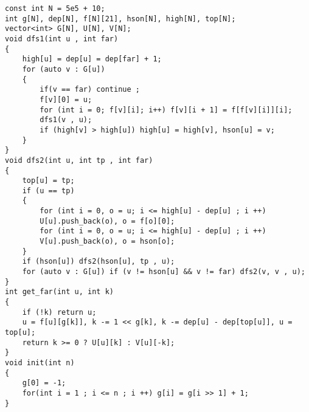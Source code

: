 \documentclass[E:/GsjzTle/main/main.tex]{subfiles}
\begin{document}
\begin{lstlisting}
const int N = 5e5 + 10;
int g[N], dep[N], f[N][21], hson[N], high[N], top[N];
vector<int> G[N], U[N], V[N];
void dfs1(int u , int far)
{
	high[u] = dep[u] = dep[far] + 1;
	for (auto v : G[u])
	{
		if(v == far) continue ;
		f[v][0] = u;
		for (int i = 0; f[v][i]; i++) f[v][i + 1] = f[f[v][i]][i];
		dfs1(v , u);
		if (high[v] > high[u]) high[u] = high[v], hson[u] = v;
	}
}
void dfs2(int u, int tp , int far)
{
	top[u] = tp;
	if (u == tp)
	{
		for (int i = 0, o = u; i <= high[u] - dep[u] ; i ++)
		U[u].push_back(o), o = f[o][0];
		for (int i = 0, o = u; i <= high[u] - dep[u] ; i ++)
		V[u].push_back(o), o = hson[o];
	}
	if (hson[u]) dfs2(hson[u], tp , u);
	for (auto v : G[u]) if (v != hson[u] && v != far) dfs2(v, v , u);
}
int get_far(int u, int k)
{
	if (!k) return u;
	u = f[u][g[k]], k -= 1 << g[k], k -= dep[u] - dep[top[u]], u = top[u];
	return k >= 0 ? U[u][k] : V[u][-k];
}
void init(int n)
{
	g[0] = -1;
	for(int i = 1 ; i <= n ; i ++) g[i] = g[i >> 1] + 1;
}
\end{lstlisting}
\end{document}
